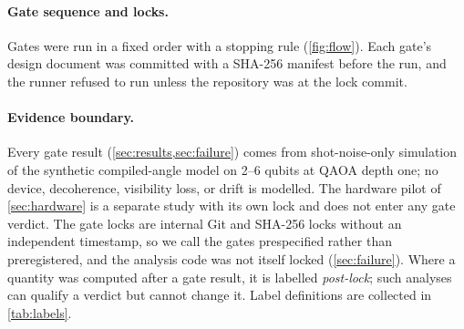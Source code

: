 \documentclass[10pt,twocolumn]{article}
\theoremstyle{definition}
\theoremstyle{remark}
\begin{document}
\paragraph{Gate sequence and locks.} Gates were run in a fixed order with a stopping rule (\cref{fig:flow}). Each gate's design document was committed with a SHA-256 manifest before the run, and the runner refused to run unless the repository was at the lock commit.

\paragraph{Evidence boundary.} Every gate result (\cref{sec:results,sec:failure}) comes from shot-noise-only simulation of the synthetic compiled-angle model on 2--6 qubits at QAOA depth one; no device, decoherence, visibility loss, or drift is modelled. The hardware pilot of \cref{sec:hardware} is a separate study with its own lock and does not enter any gate verdict. The gate locks are internal Git and SHA-256 locks without an independent timestamp, so we call the gates prespecified rather than preregistered, and the analysis code was not itself locked (\cref{sec:failure}). Where a quantity was computed after a gate result, it is labelled \emph{post-lock}; such analyses can qualify a verdict but cannot change it. Label definitions are collected in \cref{tab:labels}.
\end{document}
